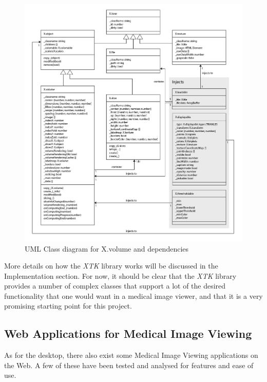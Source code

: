 \documentclass[a4paper,11pt,twoside]{article}
\begin{document}
\begin{figure}[ht!]
\centering
\includegraphics[width=165mm]{graphics/xtkUML_04.png}
\caption{UML Class diagram for X.volume and dependencies}
\label{fig:xtkVolume}
\end{figure}


More details on how the \textit{XTK} library works will be discussed in the Implementation section. For now, it should be clear that the \textit{XTK} library provides a number of complex classes that support a lot of the desired functionality that one would want in a medical image viewer, and that it is a very promising starting point for this project.



\subsection{Web Applications for Medical Image Viewing}

As for the desktop, there also exist some Medical Image Viewing applications on the Web. A few of these have been tested and analysed for features and ease of use.
\end{document}

